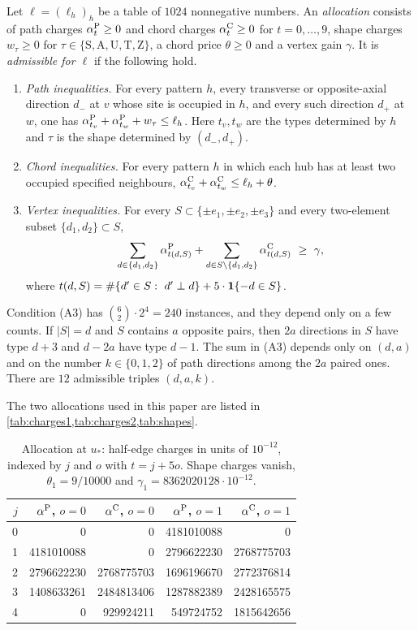 \begin{definition}\label{def:allocation}
Let $\ell=(\ell_h)_h$ be a table of $1024$ nonnegative numbers. An \emph{allocation} consists of path charges $\alpha^{\rm P}_t\ge0$ and chord charges $\alpha^{\rm C}_t\ge0$ for $t=0,\dots,9$, shape charges $w_\tau\ge0$ for $\tau\in\{\mathrm S,\mathrm A,\mathrm U,\mathrm T,\mathrm Z\}$, a chord price $\theta\ge0$ and a vertex gain $\gamma$. It is \emph{admissible for $\ell$} if the following hold.
\begin{enumerate}[label=\textup{(A\arabic*)}]
\item \emph{Path inequalities.} For every pattern $h$, every transverse or opposite-axial direction $d_-$ at $v$ whose site is occupied in $h$, and every such direction $d_+$ at $w$, one has
$\alpha^{\rm P}_{t_v}+\alpha^{\rm P}_{t_w}+w_\tau\le\ell_h$. Here $t_v,t_w$ are the types determined by $h$ and $\tau$ is the shape determined by $(d_-,d_+)$.
\item \emph{Chord inequalities.} For every pattern $h$ in which each hub has at least two occupied specified neighbours, $\alpha^{\rm C}_{t_v}+\alpha^{\rm C}_{t_w}\le\ell_h+\theta$.
\item \emph{Vertex inequalities.} For every $S\subset\{\pm e_1,\pm e_2,\pm e_3\}$ and every two-element subset $\{d_1,d_2\}\subset S$,
\[
 \sum_{d\in\{d_1,d_2\}}\alpha^{\rm P}_{t(d,S)}+\sum_{d\in S\setminus\{d_1,d_2\}}\alpha^{\rm C}_{t(d,S)}\ \ge\ \gamma,
\]
where $t(d,S)=\#\{d'\in S:\ d'\perp d\}+5\cdot\mathbf 1\{-d\in S\}$.
\end{enumerate}
\end{definition}

Condition (A3) has $\binom62\cdot2^4=240$ instances, and they depend only on a few counts. If $|S|=d$ and $S$ contains $a$ opposite pairs, then $2a$ directions in $S$ have type $d+3$ and $d-2a$ have type $d-1$. The sum in (A3) depends only on $(d,a)$ and on the number $k\in\{0,1,2\}$ of path directions among the $2a$ paired ones. There are $12$ admissible triples $(d,a,k)$.

The two allocations used in this paper are listed in \cref{tab:charges1,tab:charges2,tab:shapes}.

\begin{table}[t]
\centering\small
\caption{Allocation at $u_*$: half-edge charges in units of $10^{-12}$, indexed by $j$ and $o$ with $t=j+5o$. Shape charges vanish, $\theta_1=9/10000$ and $\gamma_1=8362020128\cdot10^{-12}$.}\label{tab:charges1}
\begin{tabular}{rrrrr}
\toprule
$j$ & $\alpha^{\rm P}$, $o=0$ & $\alpha^{\rm C}$, $o=0$ & $\alpha^{\rm P}$, $o=1$ & $\alpha^{\rm C}$, $o=1$\\
\midrule
0 & 0 & 0 & 4181010088 & 0 \\
1 & 4181010088 & 0 & 2796622230 & 2768775703 \\
2 & 2796622230 & 2768775703 & 1696196670 & 2772376814 \\
3 & 1408633261 & 2484813406 & 1287882389 & 2428165575 \\
4 & 0 & 929924211 & 549724752 & 1815642656 \\
\bottomrule
\end{tabular}
\end{table}

